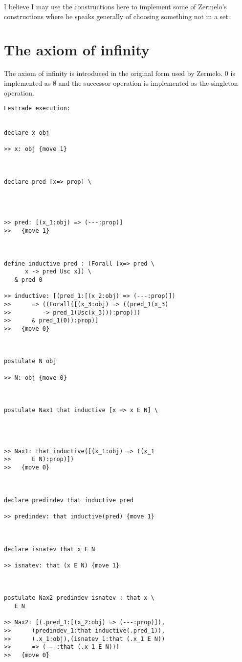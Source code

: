 \documentclass[12pt]{article}
\begin{document}
I believe I may use the constructions here to implement some of Zermelo's constructions where he speaks generally of choosing something not in a set.

\section{The axiom of infinity}

The axiom of infinity is introduced in the original form used by Zermelo.  0 is implemented as $\emptyset$ and the successor operation is implemented as the singleton operation.

\begin{verbatim}Lestrade execution:


declare x obj

>> x: obj {move 1}



declare pred [x=> prop] \
   



>> pred: [(x_1:obj) => (---:prop)]
>>   {move 1}



define inductive pred : (Forall [x=> pred \
      x -> pred Usc x]) \
   & pred 0

>> inductive: [(pred_1:[(x_2:obj) => (---:prop)])
>>      => ((Forall([(x_3:obj) => ((pred_1(x_3)
>>         -> pred_1(Usc(x_3))):prop)])
>>      & pred_1(0)):prop)]
>>   {move 0}



postulate N obj

>> N: obj {move 0}



postulate Nax1 that inductive [x => x E N] \
   



>> Nax1: that inductive([(x_1:obj) => ((x_1
>>      E N):prop)])
>>   {move 0}



declare predindev that inductive pred

>> predindev: that inductive(pred) {move 1}



declare isnatev that x E N

>> isnatev: that (x E N) {move 1}



postulate Nax2 predindev isnatev : that x \
   E N

>> Nax2: [(.pred_1:[(x_2:obj) => (---:prop)]),
>>      (predindev_1:that inductive(.pred_1)),
>>      (.x_1:obj),(isnatev_1:that (.x_1 E N))
>>      => (---:that (.x_1 E N))]
>>   {move 0}


\end{verbatim}
\end{document}
